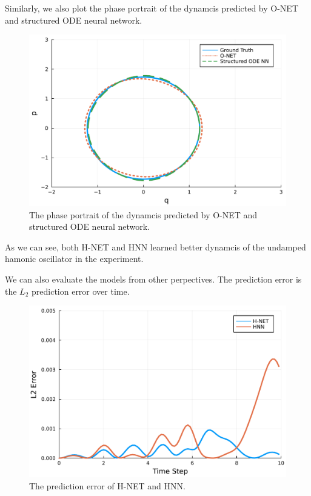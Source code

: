 \documentclass[
	parskip, 			   %
	twoside, 			   %
	DIV=14, 			   %
	BCOR=15.0mm, 		   %
	headsepline, 		   %
	open=right, 		   %
	captions=tableheading, %
	bibliography=totoc,    %
	numbers=noenddot       %
]{scrreprt}
\begin{document}
Similarly, we also plot the phase portrait of the dynamcis predicted by O-NET and structured ODE neural network.

\clearpage
\begin{figure}[h!]
    \centering
    \includegraphics[scale=0.5]{figures/phase_portrait_O_NET_and_structured_ODE_NN.pdf}
    \caption{The phase portrait of the dynamcis predicted by O-NET and structured ODE neural network.}
    \label{fig:phase_portrait_O_NET_and_structured_ODE_NN}
\end{figure}

As we can see, both H-NET and HNN learned better dynamcis of the undamped hamonic oscillator in the experiment.

We can also evaluate the models from other perpectives. The prediction error is the $L_{2}$ prediction error over time.

\begin{figure}[h!]
    \centering
    \includegraphics[scale=0.5]{figures/prediction_error_H_NET_and_HNN.pdf}
    \caption{The prediction error of H-NET and HNN.}
    \label{fig:prediction_error_H_NET_and_HNN}
\end{figure}
\end{document}
